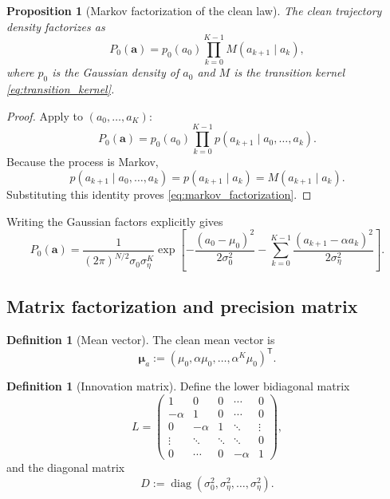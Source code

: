 \documentclass[11pt]{article}
\numberwithin{equation}{section}
\newtheorem{proposition}[theorem]{Proposition}
\theoremstyle{definition}
\newtheorem{definition}[theorem]{Definition}
\theoremstyle{remark}
\newcommand{\diag}{\operatorname{diag}}
\newcommand{\trans}{\mathsf{T}}
\begin{document}
\begin{proposition}[Markov factorization of the clean law]\label{prop:markov_fact}
The clean trajectory density factorizes as
\begin{equation}\label{eq:markov_factorization}
P_0(\mathbf a)=p_0(a_0)\prod_{k=0}^{K-1}M(a_{k+1}\mid a_k),
\end{equation}
where $p_0$ is the Gaussian density of $a_0$ and $M$ is the transition kernel \eqref{eq:transition_kernel}.
\end{proposition}

\begin{proof}
Apply  to $(a_0,\dots,a_K)$:
\[
P_0(\mathbf a)=p_0(a_0)\prod_{k=0}^{K-1}p(a_{k+1}\mid a_0,\dots,a_k).
\]
Because the process is Markov,
\[
p(a_{k+1}\mid a_0,\dots,a_k)=p(a_{k+1}\mid a_k)=M(a_{k+1}\mid a_k).
\]
Substituting this identity proves \eqref{eq:markov_factorization}.
\end{proof}

Writing the Gaussian factors explicitly gives
\begin{equation}\label{eq:p0_product_explicit}
P_0(\mathbf a)
=
\frac{1}{(2\pi)^{N/2}\sigma_0\sigma_\eta^{K}}
\exp\!\left[
-\frac{(a_0-\mu_0)^2}{2\sigma_0^2}
-\sum_{k=0}^{K-1}\frac{(a_{k+1}-\alpha a_k)^2}{2\sigma_\eta^2}
\right].
\end{equation}

\subsection{Matrix factorization and precision matrix}

\begin{definition}[Mean vector]
The clean mean vector is
\begin{equation}\label{eq:mu_a_vec}
\boldsymbol{\mu}_a:=(\mu_0,\alpha\mu_0,\dots,\alpha^K\mu_0)^\trans.
\end{equation}
\end{definition}

\begin{definition}[Innovation matrix]\label{def:L}
Define the lower bidiagonal matrix
\begin{equation}\label{eq:L}
L=
\begin{pmatrix}
1 & 0 & 0 & \cdots & 0 \\
-\alpha & 1 & 0 & \cdots & 0 \\
0 & -\alpha & 1 & \ddots & \vdots \\
\vdots & \ddots & \ddots & \ddots & 0 \\
0 & \cdots & 0 & -\alpha & 1
\end{pmatrix},
\end{equation}
and the diagonal matrix
\begin{equation}\label{eq:D}
D:=\diag(\sigma_0^2,\sigma_\eta^2,\dots,\sigma_\eta^2).
\end{equation}
\end{definition}
\end{document}
